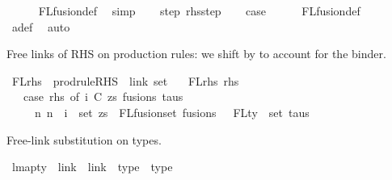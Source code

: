 \begin{isabellebody}
\ \ \ \ \isamarkupfalse%
\ FLfusion{\isacharunderscore}{\kern0pt}def\ \isamarkupfalse%
\ simp\isanewline
\isanewline
\ \ \isamarkupfalse%
\ step\ rhs{\isacharunderscore}{\kern0pt}step\isanewline
\ \ \isamarkupfalse%
\ {\isacharquery}{\kern0pt}case\isanewline
\ \ \ \ \isamarkupfalse%
\ FLfusion{\isacharunderscore}{\kern0pt}def\isanewline
\ \ \ \ \isamarkupfalse%
\ a{\isacharunderscore}{\kern0pt}def\ \isamarkupfalse%
\ auto\isanewline
{}\isamarkupfalse%
%
\endisatagproof
{\isafoldproof}%
%
\isadelimproof
%
\endisadelimproof
%
\begin{isamarkuptext}%
Free links of RHS on production rules:
we shift by  to account for the  binder.%
\end{isamarkuptext}\isamarkuptrue%
\isamarkupfalse%
\ FLrhs\ {\isacharcolon}{\kern0pt}{\isacharcolon}{\kern0pt}\ {\isachardoublequoteopen}prodrule{\isacharunderscore}{\kern0pt}RHS\ {\isacharequal}{\kern0pt}{\isachargreater}{\kern0pt}\ link\ set{\isachardoublequoteclose}\ \isanewline
\ \ {\isachardoublequoteopen}FLrhs\ rhs\ {\isacharequal}{\kern0pt}{\isacharequal}{\kern0pt}\isanewline
\ \ \ {\isacharparenleft}{\kern0pt}case\ rhs\ of\ {\isacharparenleft}{\kern0pt}i{\isacharcomma}{\kern0pt}\ {\isacharparenleft}{\kern0pt}C{\isacharcomma}{\kern0pt}\ zs{\isacharparenright}{\kern0pt}{\isacharcomma}{\kern0pt}\ fusions{\isacharcomma}{\kern0pt}\ taus{\isacharparenright}{\kern0pt}\ {\isacharequal}{\kern0pt}{\isachargreater}{\kern0pt}\isanewline
\ \ \ \ \ {\isacharbraceleft}{\kern0pt}n{\isachardot}{\kern0pt}\ n\ {\isacharplus}{\kern0pt}\ i\ {\isasymin}\ set\ zs\ {\isasymunion}\ FLfusion{\isacharunderscore}{\kern0pt}set\ fusions\ {\isasymunion}\ {\isacharparenleft}{\kern0pt}{\isasymUnion}\ {\isacharparenleft}{\kern0pt}FLty\ {\isacharbackquote}{\kern0pt}\ set\ taus{\isacharparenright}{\kern0pt}{\isacharparenright}{\kern0pt}{\isacharbraceright}{\kern0pt}{\isacharparenright}{\kern0pt}{\isachardoublequoteclose}%
\begin{isamarkuptext}%
Free-link substitution on types.%
\end{isamarkuptext}\isamarkuptrue%
\isamarkupfalse%
\ lmap{\isacharunderscore}{\kern0pt}ty\ {\isacharcolon}{\kern0pt}{\isacharcolon}{\kern0pt}\ {\isachardoublequoteopen}{\isacharparenleft}{\kern0pt}link\ {\isacharequal}{\kern0pt}{\isachargreater}{\kern0pt}\ link{\isacharparenright}{\kern0pt}\ {\isacharequal}{\kern0pt}{\isachargreater}{\kern0pt}\ type\ {\isacharequal}{\kern0pt}{\isachargreater}{\kern0pt}\ type{\isachardoublequoteclose}\ \isanewline

\end{isabellebody}
